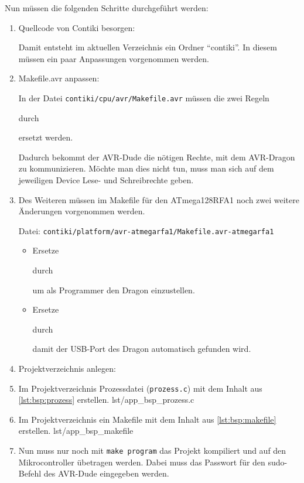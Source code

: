	Nun müssen die folgenden Schritte durchgeführt werden:
	\begin{enumerate}
	\item	Quellcode von Contiki besorgen:
		

		Damit entsteht im aktuellen Verzeichnis ein Ordner
		\enquote{contiki}.  In diesem müssen ein paar Anpassungen
		vorgenommen werden.

	\item	Makefile.avr anpassen:
		
		In der Datei \lstinline=contiki/cpu/avr/Makefile.avr=
		müssen die zwei Regeln
		
		durch
		
		ersetzt werden.

		Dadurch bekommt der AVR-Dude die nötigen Rechte, mit dem
		AVR-Dragon zu kommunizieren.  Möchte man dies nicht tun,
		muss man sich auf dem jeweiligen Device Lese- und Schreibrechte
		geben.
	
	\item	Des Weiteren müssen im Makefile für den ATmega128RFA1 noch zwei
		weitere Änderungen vorgenommen werden.

		Datei: \lstinline=contiki/platform/avr-atmegarfa1/Makefile.avr-atmegarfa1=
		\begin{itemize}
		\item	Ersetze
			
			durch
			
			um als Programmer den Dragon einzustellen.
		\item	Ersetze
			
			durch
			
			damit der USB-Port des Dragon automatisch gefunden wird.
		\end{itemize}
	
	\item	Projektverzeichnis anlegen:
		
	
	\item	Im Projektverzeichnis Prozessdatei (\lstinline=prozess.c=) mit
		dem Inhalt aus \autoref{lst:bsp:prozess} erstellen.
			{lst/app_bsp_prozess.c}

	\item	Im Projektverzeichnis ein Makefile mit dem Inhalt aus
		\autoref{lst:bsp:makefile} erstellen.
			{lst/app_bsp_makefile}
	
	\item	Nun muss nur noch mit \lstinline=make program= das Projekt
		kompiliert und auf den Mikrocontroller übetragen werden.
		Dabei muss das Passwort für den sudo-Befehl des AVR-Dude
		eingegeben werden.
	\end{enumerate}
